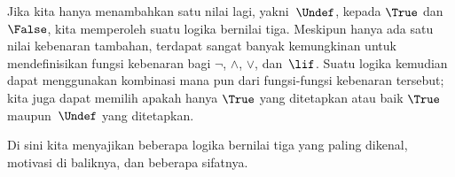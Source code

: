 \documentclass[../../../include/open-logic-section]{subfiles}
\begin{document}


Jika kita hanya menambahkan satu nilai lagi, yakni~$\Undef$, kepada $\True$
dan~$\False$, kita memperoleh suatu logika bernilai tiga. Meskipun hanya ada
satu nilai kebenaran tambahan, terdapat sangat banyak kemungkinan untuk
mendefinisikan fungsi kebenaran bagi $\lnot$, $\land$, $\lor$, dan~$\lif$.
Suatu logika kemudian dapat menggunakan kombinasi mana pun dari fungsi-fungsi
kebenaran tersebut; kita juga dapat memilih apakah hanya $\True$ yang
ditetapkan atau baik $\True$ maupun~$\Undef$ yang ditetapkan.

Di sini kita menyajikan beberapa logika bernilai tiga yang paling dikenal,
motivasi di baliknya, dan beberapa sifatnya.
\end{document}
